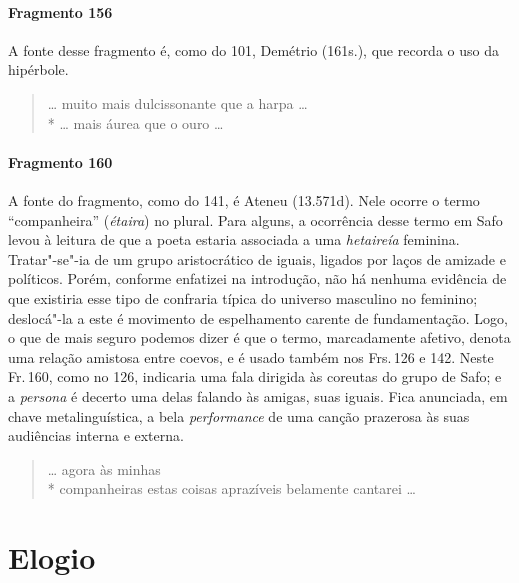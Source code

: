 {\paragraph{Fragmento 156}

{\small A fonte desse fragmento é, como do 101, Demétrio (161s.), que recorda o uso da
hipérbole.}

\begin{verse}
\ldots{} muito mais dulcissonante que a harpa \ldots{}\\*
\ldots{} mais áurea que o ouro \ldots{}
\end{verse}

\paragraph{Fragmento 160}

{\small A fonte do fragmento, como do 141, é Ateneu (13.571d). Nele ocorre o termo ``companheira” (\textit{étaira}) no plural.
Para alguns, a ocorrência desse termo em Safo levou à leitura de que a poeta estaria associada a uma \textit{hetaireía} feminina. Tratar"-se"-ia de um grupo aristocrático de iguais, ligados por laços de amizade e políticos. Porém, conforme enfatizei na introdução, não há nenhuma evidência de que existiria esse tipo de confraria típica do universo masculino no feminino; deslocá"-la a este é movimento de espelhamento carente de fundamentação. Logo, o que de mais seguro podemos dizer é que o termo, marcadamente afetivo, denota uma relação amistosa entre coevos, e é usado também nos Frs.\,126 e 142. Neste Fr.\,160, como no 126, indicaria uma fala dirigida às coreutas do grupo de Safo; e a \textit{persona} é decerto uma delas falando às amigas, suas iguais. Fica anunciada, em chave metalinguística, a bela \textit{performance}
de uma canção prazerosa às suas audiências interna e externa.}

\begin{verse}
\ldots{} agora às minhas\\*
companheiras estas coisas aprazíveis belamente \qb{}cantarei \ldots{}
\end{verse}


\section{Elogio}

}
